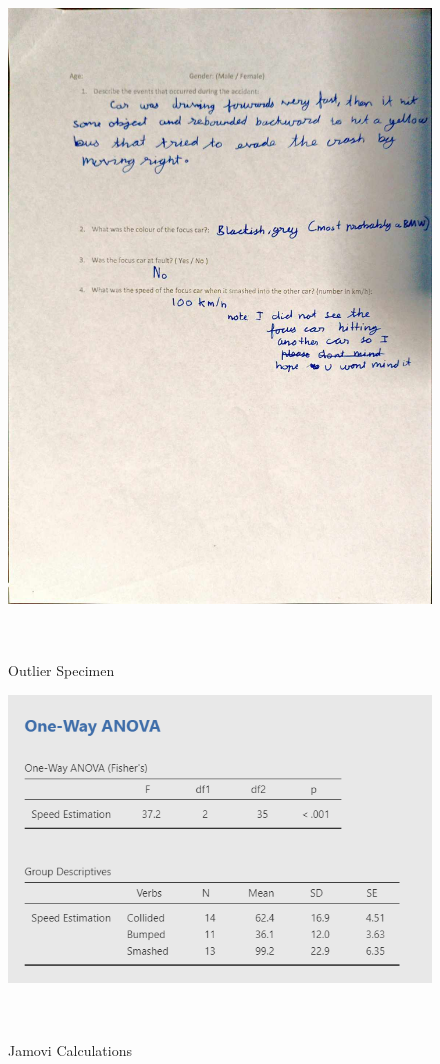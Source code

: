 \documentclass[11pt]{article}
\begin{document}
\begin{figure}[H]
  \caption{ ~\\Outlier Specimen} 
  \centering 
  \includegraphics[width=\textwidth]{outlier.jpg}
~\label{fig:outlier}
\end{figure} 

\begin{figure}[H]
  \caption{ ~\\Jamovi Calculations} 
  \centering 
  \includegraphics[width=\textwidth]{jamoviCalc.png}
~\label{fig:jamoviCalc}
\end{figure} 
\end{document}
